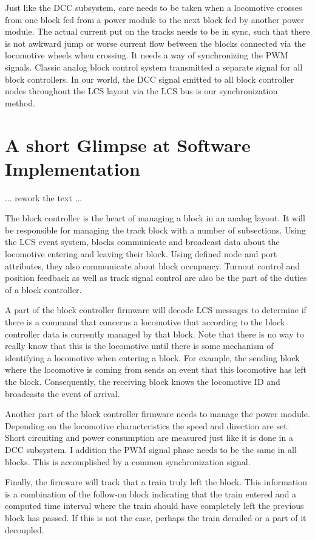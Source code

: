 Just like the DCC subsystem, care needs to be taken when a locomotive crosses from one block fed from a power module to the next block fed by another power module. The actual current put on the tracks needs to be in sync, such that there is not awkward jump or worse current flow between the blocks connected via the locomotive wheels when crossing. It needs a way of synchronizing the PWM signals. Classic analog block control system transmitted a separate signal for all block controllers. In our world, the DCC signal emitted to all block controller nodes throughout the LCS layout via the LCS bus is our synchronization method.

\section{A short Glimpse at Software Implementation}

... rework the text ...

The block controller is the heart of managing a block in an analog layout. It will be responsible for managing the track block with a number of subsections. Using the LCS event system, blocks communicate and broadcast data about the locomotive entering and leaving their block. Using defined node and port attributes, they also communicate about block occupancy. Turnout control and position feedback as well as track signal control are also be the part of the duties of a block controller.

A part of the block controller firmware will decode LCS messages to determine if there is a command that concerns a locomotive that according to the block controller data is currently managed by that block. Note that there is no way to really know that this is the locomotive until there is some mechanism of identifying a locomotive when entering a block. For example, the sending block where the locomotive is coming from sends an event that this locomotive has left the block. Consequently, the receiving block knows the locomotive ID and broadcasts the event of arrival.

Another part of the block controller firmware needs to manage the power module. Depending on the locomotive characteristics the speed and direction are set. Short circuiting and power consumption are measured just like it is done in a DCC subsystem. I addition the PWM signal phase needs to be the same in all blocks. This is accomplished by a common synchronization signal.

Finally, the firmware will track that a train truly left the block. This information is a combination of the follow-on block indicating that the train entered and a computed time interval where the train should have completely left the previous block has passed. If this is not the case, perhaps the train derailed or a part of it decoupled.

